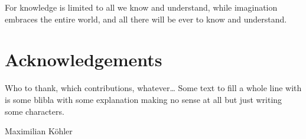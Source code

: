 
\thispagestyle{plain}
\begingroup
\begin{fquote}
    For knowledge is limited to all we know and understand, while imagination embraces the entire world, and all there will be ever to know and understand.
\end{fquote}
\let\cleardoublepage\relax
\vspace{-1cm}

\chapter*{Acknowledgements}
\endgroup

Who to thank, which contributions, whatever\dots
Some text to fill a whole line with is some blibla with some explanation making no sense at all but just writing some characters.

\begin{flushright}
    Maximilian Köhler
\end{flushright}
